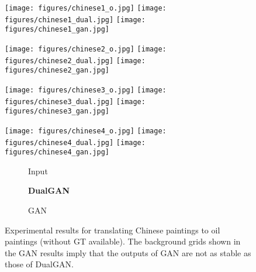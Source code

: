 \begin{figure}
\begin{center}
\texttt{[image: figures/chinese1\_o.jpg]}
\texttt{[image: figures/chinese1\_dual.jpg]}
\texttt{[image: figures/chinese1\_gan.jpg]}

\texttt{[image: figures/chinese2\_o.jpg]}
\texttt{[image: figures/chinese2\_dual.jpg]}
\texttt{[image: figures/chinese2\_gan.jpg]}

\texttt{[image: figures/chinese3\_o.jpg]}
\texttt{[image: figures/chinese3\_dual.jpg]}
\texttt{[image: figures/chinese3\_gan.jpg]}

\texttt{[image: figures/chinese4\_o.jpg]}
\texttt{[image: figures/chinese4\_dual.jpg]}
\texttt{[image: figures/chinese4\_gan.jpg]}

\begin{subfigure}[]{0.32\linewidth}\caption*{Input}\end{subfigure}
\begin{subfigure}[]{0.32\linewidth}\caption*{\textbf{DualGAN}}\end{subfigure}
\begin{subfigure}[]{0.32\linewidth}\caption*{GAN}\end{subfigure}
\caption{Experimental results for translating Chinese paintings to oil paintings
(without GT available). The background grids shown in the GAN results imply that the outputs of GAN 
are not as stable as those of DualGAN.} \label{fig:chinese}
\end{center}
\end{figure}


